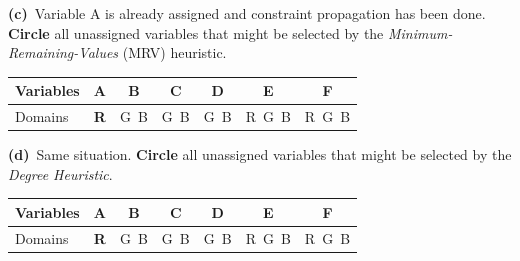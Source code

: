 \documentclass[11pt,a4paper]{article}
\newcommand{\subq}[1]{\par\smallskip\noindent\textbf{#1}\ }
\begin{document}
\subq{(c)}Variable A is already assigned and constraint propagation has been done. \textbf{Circle} all unassigned variables that might be selected by the \emph{Minimum-Remaining-Values} (MRV) heuristic.\begin{center}\small\begin{tabular}{|l|c|c|c|c|c|c|}\hline Variables & \textbf{A} & \textbf{B} & \textbf{C} & \textbf{D} & \textbf{E} & \textbf{F}\\ \hline Domains & \textbf{R} & G\ B & G\ B & G\ B & R\ G\ B & R\ G\ B\\ \hline\end{tabular}\end{center}

\subq{(d)}Same situation. \textbf{Circle} all unassigned variables that might be selected by the \emph{Degree Heuristic}.\begin{center}\small\begin{tabular}{|l|c|c|c|c|c|c|}\hline Variables & \textbf{A} & \textbf{B} & \textbf{C} & \textbf{D} & \textbf{E} & \textbf{F}\\ \hline Domains & \textbf{R} & G\ B & G\ B & G\ B & R\ G\ B & R\ G\ B\\ \hline\end{tabular}\end{center}
\end{document}
